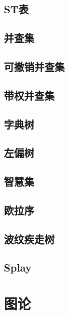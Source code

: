 \subsection{ST表}


\subsection{并查集}


\subsection{可撤销并查集}

\subsection{带权并查集}


\subsection{字典树}

\subsection{左偏树}

\subsection{智慧集}


\subsection{欧拉序}

\subsection{波纹疾走树}


\subsection{Splay}


\section{图论}
